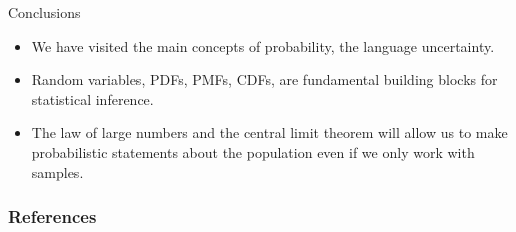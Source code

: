 \documentclass[handout]{beamer}
\begin{document}
\begin{frame}{ Conclusions}
\scriptsize{
\begin{itemize}
 \item We have visited the main concepts of probability, the language uncertainty.
 \item Random variables, PDFs, PMFs, CDFs, are fundamental building blocks for statistical inference.
 \item The law of large numbers and the central limit theorem will allow us to make probabilistic statements about the population even if we only work with samples.
\end{itemize}


 }
\end{frame}



\begin{frame}[allowframebreaks]\scriptsize
\frametitle{References}


%
\end{frame}  










\end{document}
